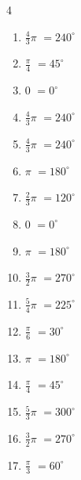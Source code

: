 \begin{multicols}{4}
\begin{enumerate}
  \item $\displaystyle \frac{4}{3}\pi$
        $\displaystyle =240^{\circ}$

  \item $\displaystyle \frac{\pi}{4}$
        $\displaystyle =45^{\circ}$

  \item $\displaystyle 0$
        $\displaystyle =0^{\circ}$

  \item $\displaystyle \frac{4}{3}\pi$
        $\displaystyle =240^{\circ}$

  \item $\displaystyle \frac{4}{3}\pi$
        $\displaystyle =240^{\circ}$

  \item $\displaystyle \pi$
        $\displaystyle =180^{\circ}$

  \item $\displaystyle \frac{2}{3}\pi$
        $\displaystyle =120^{\circ}$

\columnbreak %

  \item $\displaystyle 0$
        $\displaystyle =0^{\circ}$

  \item $\displaystyle \pi$
        $\displaystyle =180^{\circ}$

  \item $\displaystyle \frac{3}{2}\pi$
        $\displaystyle =270^{\circ}$

  \item $\displaystyle \frac{5}{4}\pi$
        $\displaystyle =225^{\circ}$

  \item $\displaystyle \frac{\pi}{6}$
        $\displaystyle =30^{\circ}$

  \item $\displaystyle \pi$
        $\displaystyle =180^{\circ}$

  \item $\displaystyle \frac{\pi}{4}$
        $\displaystyle =45^{\circ}$

  \item $\displaystyle \frac{5}{3}\pi$
        $\displaystyle =300^{\circ}$

  \item $\displaystyle \frac{3}{2}\pi$
        $\displaystyle =270^{\circ}$

  \item $\displaystyle \frac{\pi}{3}$
        $\displaystyle =60^{\circ}$


\end{enumerate}
\end{multicols}
